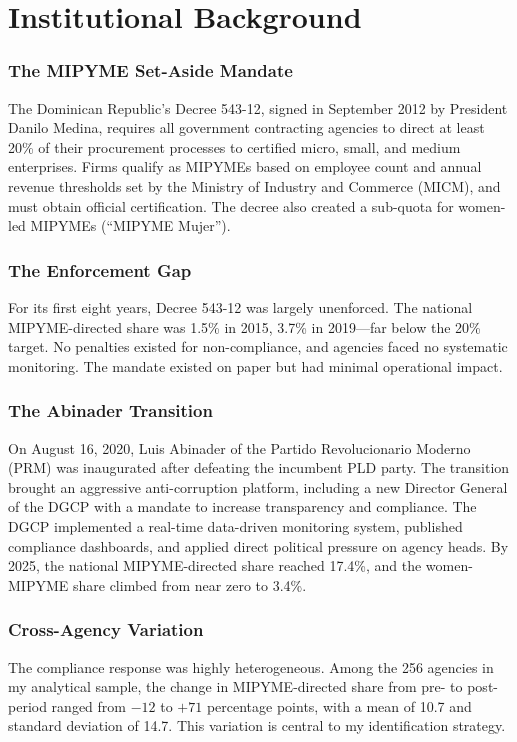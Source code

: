 \documentclass[12pt]{article}
\begin{document}
\section{Institutional Background}

\subsubsection*{The MIPYME Set-Aside Mandate} The Dominican Republic's Decree 543-12, signed in September 2012 by President Danilo Medina, requires all government contracting agencies to direct at least 20\% of their procurement processes to certified micro, small, and medium enterprises. Firms qualify as MIPYMEs based on employee count and annual revenue thresholds set by the Ministry of Industry and Commerce (MICM), and must obtain official certification. The decree also created a sub-quota for women-led MIPYMEs (``MIPYME Mujer'').

\subsubsection*{The Enforcement Gap} For its first eight years, Decree 543-12 was largely unenforced. The national MIPYME-directed share was 1.5\% in 2015, 3.7\% in 2019---far below the 20\% target. No penalties existed for non-compliance, and agencies faced no systematic monitoring. The mandate existed on paper but had minimal operational impact.

\subsubsection*{The Abinader Transition} On August 16, 2020, Luis Abinader of the Partido Revolucionario Moderno (PRM) was inaugurated after defeating the incumbent PLD party. The transition brought an aggressive anti-corruption platform, including a new Director General of the DGCP with a mandate to increase transparency and compliance. The DGCP implemented a real-time data-driven monitoring system, published compliance dashboards, and applied direct political pressure on agency heads. By 2025, the national MIPYME-directed share reached 17.4\%, and the women-MIPYME share climbed from near zero to 3.4\%.

\subsubsection*{Cross-Agency Variation} The compliance response was highly heterogeneous. Among the 256 agencies in my analytical sample, the change in MIPYME-directed share from pre- to post-period ranged from $-12$ to $+71$ percentage points, with a mean of 10.7 and standard deviation of 14.7. This variation is central to my identification strategy.
\end{document}
